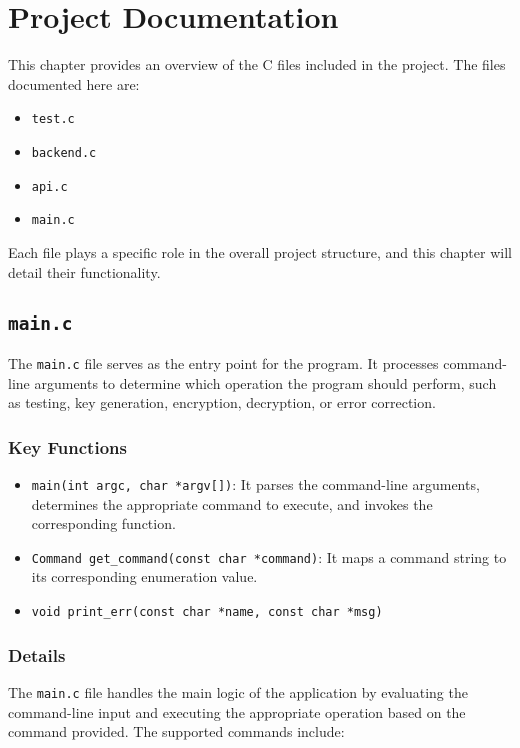 \chapter{Project Documentation}

This chapter provides an overview of the C files included in the project. The files documented here are:
\begin{itemize}
    \item \texttt{test.c}
    \item \texttt{backend.c}
    \item \texttt{api.c}
    \item \texttt{main.c}
\end{itemize}
Each file plays a specific role in the overall project structure, and this chapter will detail their functionality.

\section{\texttt{main.c}}
The \texttt{main.c} file serves as the entry point for the program. It processes command-line arguments to determine which operation the program should perform, such as testing, key generation, encryption, decryption, or error correction.

\subsection{Key Functions}
\begin{itemize}
    \item \texttt{main(int argc, char *argv[])}: It parses the command-line arguments, determines the appropriate command to execute, and invokes the corresponding function.
    \item \texttt{Command get\_command(const char *command)}: It maps a command string to its corresponding enumeration value.
    \item \texttt{void print\_err(const char *name, const char *msg)}
\end{itemize}

\subsection{Details}
The \texttt{main.c} file handles the main logic of the application by evaluating the command-line input and executing the appropriate operation based on the command provided. The supported commands include:

